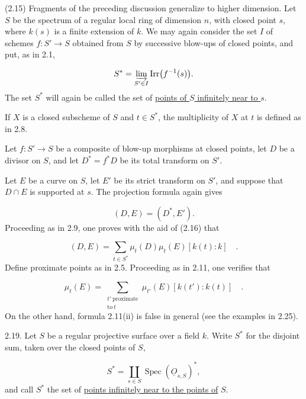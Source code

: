 (2.15) Fragments of the preceding discussion generalize to higher dimension.  Let
$S$ be the spectrum of a regular local ring of dimension $n$, with closed point
$s$, where $k(s)$ is a finite extension of $k$.  We may again consider the set
$I$ of schemes $f:S'\longrightarrow S$ obtained from $S$ by successive blow-ups
of closed points, and put, as in 2.1,

\begin{equation*}
S^*=\varinjlim_{S'\in I}\operatorname{Irr}\bigl(f^{-1}(s)\bigr).
\end{equation*}
The set $S^*$ will again be called the set of \underline{points of $S$
infinitely near to $s$}.

If $X$ is a closed subscheme of $S$ and $t\in S^*$, the multiplicity of $X$ at
$t$ is defined as in 2.8.

Let $f:S'\longrightarrow S$ be a composite of blow-up morphisms at closed
points, let $D$ be a divisor on $S$, and let $D^*=f^*D$ be its total transform
on $S'$.


Let $E$ be a curve on $S$, let $E'$ be its strict transform on $S'$, and suppose
that $D\cap E$ is supported at $s$.  The projection formula again gives

\begin{equation}\tag{2.16}
(D,E)=(D^*,E').
\end{equation}
Proceeding as in 2.9, one proves with the aid of (2.16) that

\begin{equation}\tag{2.17}
(D,E)=\sum_{t\in S^*}\mu_t(D)\mu_t(E)[k(t):k] \quad .
\end{equation}
Define proximate points as in 2.5.  Proceeding as in 2.11, one verifies that

\begin{equation}\tag{2.18}
\mu_t(E)=
\sum_{\substack{t'\ \mathrm{proximate}\\\mathrm{to}\ t}}
\mu_{t'}(E)[k(t'):k(t)] \quad .
\end{equation}
On the other hand, formula 2.11(ii) is false in general (see the examples in
2.25).

2.19. Let $S$ be a regular projective surface over a field $k$.  Write $S^*$
for the disjoint sum, taken over the closed points of $S$,

\begin{equation*}
S^*=\coprod_{s\in S}\operatorname{Spec}(\underline{O}_{s,S})^*,
\end{equation*}
and call $S^*$ the set of \underline{points infinitely near to the points of}
$S$.

